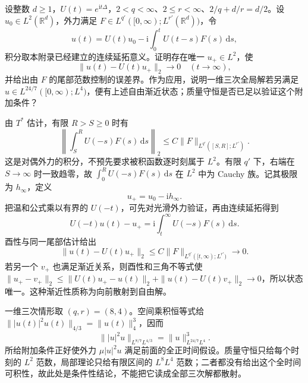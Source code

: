 \begin{exercise}\label{b2:ex:app-E-7}
设整数 \(d\geq1\)，\(U(t)=e^{\mathrm it\Delta}\)，\(2<q<\infty\)、\(2\leq r<\infty\)、\(2/q+d/r=d/2\)。设 \(u_0\in L^2(\mathbb R^d)\)，外力满足 \(F\in L^{q'}([0,\infty);L^{r'}(\mathbb R^d))\)，令
\[
 u(t)=U(t)u_0-\mathrm i\int_0^tU(t-s)F(s)\,\mathrm ds,
\]
积分取本附录已经建立的连续延拓意义。证明存在唯一 \(u_+\in L^2\)，使
\[
 \|u(t)-U(t)u_+\|_2\longrightarrow0\quad(t\to\infty),
\]
并给出由 \(F\) 的尾部范数控制的误差界。作为应用，说明一维三次全局解若另满足 \(u\in L^{24/7}([0,\infty);L^4)\)，便有上述自由渐近状态；质量守恒是否已足以验证这个附加条件？
\end{exercise}
\begin{solution}
由 \(T^*\) 估计，有限 \(R>S\geq0\) 时有
\[
 \left\|\int_S^RU(-s)F(s)\,\mathrm ds\right\|_2
 \leq C\|F\|_{L^{q'}([S,R];L^{r'})}.
\]
这是对偶外力的积分，不预先要求被积函数逐时刻属于 \(L^2\)。有限 \(q'\) 下，右端在 \(S\to\infty\) 时一致趋零，故 \(\int_0^R U(-s)F(s)\,\mathrm ds\) 在 \(L^2\) 中为 Cauchy 族。记其极限为 \(h_\infty\)，定义
\[
 u_+=u_0-\mathrm i h_\infty.
\]
把温和公式乘以有界的 \(U(-t)\)，可先对光滑外力验证，再由连续延拓得到
\[
 U(-t)u(t)-u_+=\mathrm i\int_t^\infty U(-s)F(s)\,\mathrm ds.
\]
酉性与同一尾部估计给出
\[
 \|u(t)-U(t)u_+\|_2
 \leq C\|F\|_{L^{q'}([t,\infty);L^{r'})}\longrightarrow0.
\]
若另一个 \(v_+\) 也满足渐近关系，则酉性和三角不等式使
\(\|u_+-v_+\|_2\leq\|U(t)u_+-u(t)\|_2+\|u(t)-U(t)v_+\|_2\to0\)，所以状态唯一。这种渐近性质称为向前散射到自由解。

一维三次情形取 \((q,r)=(8,4)\)。空间乘积恒等式给
\(\||u(t)|^2u(t)\|_{4/3}=\|u(t)\|_4^3\)，因而
\[
 \||u|^2u\|_{L^{8/7}L^{4/3}}
 =\|u\|_{L^{24/7}L^4}^3.
\]
所给附加条件正好使外力 \(\mu|u|^2u\) 满足前面的全正时间假设。质量守恒只给每个时刻的 \(L^2\) 范数，局部理论只给有限区间的 \(L^8L^4\) 范数；二者都没有给出这个全时间可积性，故此处是条件性结论，不能把它读成全部三次解都散射。
\end{solution}

